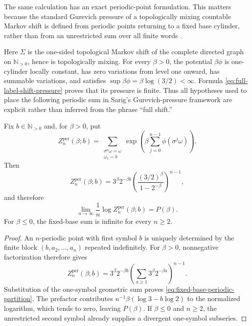 The same calculation has an exact periodic-point formulation.  This matters
because the standard Gurevich pressure of a topologically mixing countable
Markov shift is defined from periodic points returning to a fixed base
cylinder, rather than from an unrestricted sum over all finite words
\cite[Sections 2 and 4]{Sarig1999}.

Here $\Sigma$ is the one-sided topological Markov shift of the complete
directed graph on $\mathbb N_{>0}$, hence is topologically mixing.  For every
$\beta>0$, the potential $\beta\phi$ is one-cylinder locally constant, has
zero variations from level one onward, has summable variations, and satisfies
$\sup\beta\phi=\beta\log(3/2)<\infty$.  Formula
\eqref{eq:full-label-shift-pressure} proves that its pressure is finite.  Thus
all hypotheses used to place the following periodic sum in Sarig's
Gurevich-pressure framework are explicit rather than inferred from the phrase
``full shift.''

\begin{proposition}
\label{prop:full-shift-gurevich-pressure}
Fix $b\in\mathbb N_{>0}$ and, for $\beta>0$, put
\[
 Z_n^{\mathrm{per}}(\beta;b)
 =\sum_{\substack{\sigma^n\omega=\omega\\ \omega_1=b}}
   \exp\left(\beta\sum_{j=0}^{n-1}\phi(\sigma^j\omega)\right).
\]
Then
\begin{equation}
\label{eq:fixed-base-periodic-partition}
 Z_n^{\mathrm{per}}(\beta;b)
 =3^\beta2^{-\beta b}
  \left(\frac{(3/2)^\beta}{1-2^{-\beta}}\right)^{n-1},
\end{equation}
and therefore
\[
 \lim_{n\to\infty}\frac1n\log Z_n^{\mathrm{per}}(\beta;b)
 =P(\beta).
\]
For $\beta\leq0$, the fixed-base sum is infinite for every $n\geq2$.
\end{proposition}

\begin{proof}
An $n$-periodic point with first symbol $b$ is uniquely determined by the
finite block $(b,a_2,\ldots,a_n)$ repeated indefinitely.  For $\beta>0$,
nonnegative factorization therefore gives
\[
 Z_n^{\mathrm{per}}(\beta;b)
 =3^\beta2^{-\beta b}
  \left(\sum_{a\geq1}3^\beta2^{-\beta a}\right)^{n-1}.
\]
Substitution of the one-symbol geometric sum proves
\eqref{eq:fixed-base-periodic-partition}.  The prefactor contributes
$n^{-1}\beta(\log3-b\log2)$ to the normalized logarithm, which tends to
zero, leaving $P(\beta)$.  If $\beta\leq0$ and $n\geq2$, the unrestricted
second symbol already supplies a divergent one-symbol subseries.
\end{proof}

